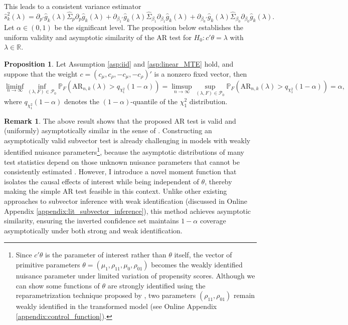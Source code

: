 \documentclass[11pt]{article}
\theoremstyle{definition}
\newtheorem{proposition}{Proposition}[section]
\newtheorem{remark}{Remark}[section]
\newcommand{\R}{\ensuremath{\mathbb{R}}}
\newcommand{\Prob}{\ensuremath{\mathbb{P}}} %
\newcommand{\0}{\ensuremath{\mathbf{0}}}
\begin{document}
\begin{bibunit}
This leads to a consistent variance estimator
\[
    \hat{s}_{k}^2(\lambda) = \partial_{p'}\hat{g}_k(\lambda) \hat{\Sigma}_p \partial_{p}\hat{g}_k(\lambda) +  \partial_{\beta_1'}\hat{g}_k(\lambda) \hat{\Sigma}_{\beta_1} \partial_{\beta_1}\hat{g}_k(\lambda) +  \partial_{\beta_0'}\hat{g}_k(\lambda) \hat{\Sigma}_{\beta_0} \partial_{\beta_0}\hat{g}_k(\lambda).
\]
Let $\alpha \in (0,1)$ be the significant level. The proposition below establishes the uniform validity and asymptotic similarity of the AR test for $H_0:c'\theta=\lambda$ with $\lambda \in \R$. 

\begin{proposition}
\label{prop:AR_validity}
Let Assumption \ref{asp:iid} and \ref{asp:linear_MTE} hold, and suppose that the weight $c = (c_\mu, c_\rho, -c_\mu, -c_\rho)'$ is a nonzero fixed vector, then 
\[
	\liminf_{n\to\infty}\inf_{(\lambda,F)\in \mathcal{P}_0} \Prob_F\left(\text{AR}_{n,k}(\lambda) > q_{\chi_1^2}(1-\alpha)\right) = \limsup_{n\to\infty}\sup_{(\lambda,F)\in \mathcal{P}_0} \Prob_F\left(\text{AR}_{n,k}(\lambda) > q_{\chi_1^2}(1-\alpha)\right) = \alpha,
\] 
where $q_{\chi_1^2}(1-\alpha)$ denotes the $(1-\alpha)$-quantile of the $\chi_1^2$ distribution.
\end{proposition}

\begin{remark}
The above result shows that the proposed AR test is valid and (uniformly) asymptotically similar in the sense of \citet[eq.(2.6)]{andrews/cheng/guggenberger:2020}. Constructing an asymptotically valid subvector test is already challenging in models with weakly identified nuisance parameters\footnote{Since $c'\theta$ is the parameter of interest rather than $\theta$ itself, the vector of primitive parameters $\theta = (\mu_1, \rho_{11}, \mu_0, \rho_{01})$ becomes the weakly identified nuisance parameter under limited variation of propensity scores. Although we can show some functions of $\theta$ are strongly identified using the reparametrization technique proposed by \cite{han/mccloskey:2019}, two parameters $(\rho_{11}, \rho_{01})$ remain weakly identified in the transformed model (see Online Appendix \ref{appendix:control_function}).}, because the asymptotic distributions of many test statistics depend on those unknown nuisance parameters that cannot be consistently estimated \citep[page 1595]{andrews/mikusheva:2016b}.  However, I introduce a novel moment function that isolates the causal effects of interest while being independent of $\theta$, thereby making the simple AR test feasible in this context. Unlike other existing approaches to subvector inference with weak identification (discussed in Online Appendix \ref{appendix:lit_subvector_inference}), this method achieves asymptotic similarity, ensuring the inverted confidence set  maintains $1-\alpha$ coverage asymptotically under both strong and weak identification. %
\end{remark}


\end{bibunit}
\end{document}
